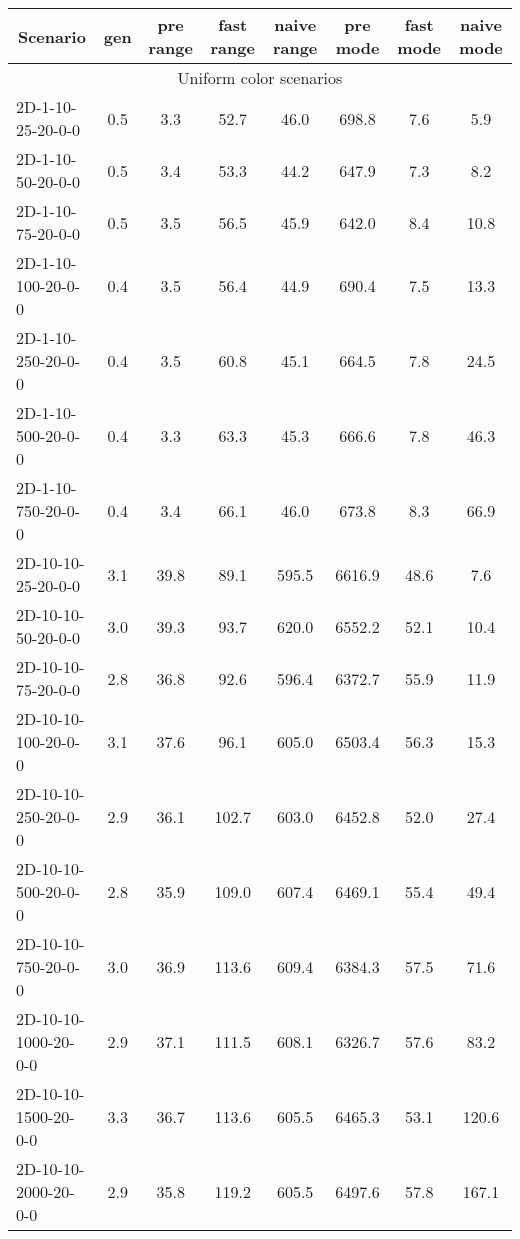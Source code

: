 \documentclass{article}
\begin{document}
\begin{center}
    \begin{table}[h]
        \hskip0.8cm
        \begin{tabular}{|l||c|c|c|c|c|c|c|}
        \hline
        \multicolumn{1}{|c|}{Scenario} & gen & pre range & fast range & naive range & pre mode & fast mode & naive mode  \\
        \hline
        \hline
        \multicolumn{8}{|c|}{Uniform color scenarios} \\
        \hline
        2D-1-10-25-20-0-0 & 0.5 & 3.3 & 52.7 & 46.0 & 698.8 & 7.6 & 5.9 \\
        2D-1-10-50-20-0-0 & 0.5 & 3.4 & 53.3 & 44.2 & 647.9 & 7.3 & 8.2 \\
        2D-1-10-75-20-0-0 & 0.5 & 3.5 & 56.5 & 45.9 & 642.0 & 8.4 & 10.8 \\
        2D-1-10-100-20-0-0 & 0.4 & 3.5 & 56.4 & 44.9 & 690.4 & 7.5 & 13.3 \\
        2D-1-10-250-20-0-0 & 0.4 & 3.5 & 60.8 & 45.1 & 664.5 & 7.8 & 24.5 \\
        2D-1-10-500-20-0-0 & 0.4 & 3.3 & 63.3 & 45.3 & 666.6 & 7.8 & 46.3 \\
        2D-1-10-750-20-0-0 & 0.4 & 3.4 & 66.1 & 46.0 & 673.8 & 8.3 & 66.9 \\
        \hline
        2D-10-10-25-20-0-0 & 3.1 & 39.8 & 89.1 & 595.5 & 6616.9 & 48.6 & 7.6 \\
        2D-10-10-50-20-0-0 & 3.0 & 39.3 & 93.7 & 620.0 & 6552.2 & 52.1 & 10.4 \\
        2D-10-10-75-20-0-0 & 2.8 & 36.8 & 92.6 & 596.4 & 6372.7 & 55.9 & 11.9 \\
        2D-10-10-100-20-0-0 & 3.1 & 37.6 & 96.1 & 605.0 & 6503.4 & 56.3 & 15.3 \\
        2D-10-10-250-20-0-0 & 2.9 & 36.1 & 102.7 & 603.0 & 6452.8 & 52.0 & 27.4 \\
        2D-10-10-500-20-0-0 & 2.8 & 35.9 & 109.0 & 607.4 & 6469.1 & 55.4 & 49.4 \\
        2D-10-10-750-20-0-0 & 3.0 & 36.9 & 113.6 & 609.4 & 6384.3 & 57.5 & 71.6 \\
        2D-10-10-1000-20-0-0 & 2.9 & 37.1 & 111.5 & 608.1 & 6326.7 & 57.6 & 83.2 \\
        2D-10-10-1500-20-0-0 & 3.3 & 36.7 & 113.6 & 605.5 & 6465.3 & 53.1 & 120.6 \\
        2D-10-10-2000-20-0-0 & 2.9 & 35.8 & 119.2 & 605.5 & 6497.6 & 57.8 & 167.1 \\
        \hline

\end{tabular}
\end{table}
\end{center}
\end{document}

